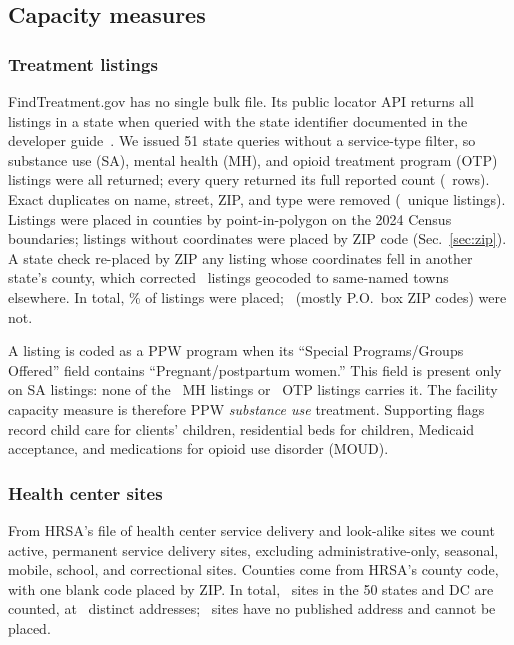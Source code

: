 \documentclass[10pt,twocolumn,letterpaper]{article}
\begin{document}
\subsection{Capacity measures}

\subsubsection{Treatment listings}
FindTreatment.gov has no single bulk file. Its public locator API returns all listings in a state when queried with the state identifier documented in the developer guide~\cite{ftguide}. We issued 51 state queries without a service-type filter, so substance use (SA), mental health (MH), and opioid treatment program (OTP) listings were all returned; every query returned its full reported count (\FTRaw\ rows). Exact duplicates on name, street, ZIP, and type were removed (\FTUnique\ unique listings). Listings were placed in counties by point-in-polygon on the 2024 Census boundaries; listings without coordinates were placed by ZIP code (Sec.~\ref{sec:zip}). A state check re-placed by ZIP any listing whose coordinates fell in another state's county, which corrected \FTMismatch\ listings geocoded to same-named towns elsewhere. In total, \FTAssignedPct\% of listings were placed; \FTUnassigned\ (mostly P.O.~box ZIP codes) were not.

A listing is coded as a PPW program when its ``Special Programs/Groups Offered'' field contains ``Pregnant/postpartum women.'' This field is present only on SA listings: none of the \FTMH\ MH listings or \FTOTP\ OTP listings carries it. The facility capacity measure is therefore PPW \emph{substance use} treatment. Supporting flags record child care for clients' children, residential beds for children, Medicaid acceptance, and medications for opioid use disorder (MOUD).

\subsubsection{Health center sites}
From HRSA's file of health center service delivery and look-alike sites we count active, permanent service delivery sites, excluding administrative-only, seasonal, mobile, school, and correctional sites. Counties come from HRSA's county code, with one blank code placed by ZIP. In total, \HCSites\ sites in the 50 states and DC are counted, at \HCLocations\ distinct addresses; \HCUnplaced\ sites have no published address and cannot be placed.
\end{document}

